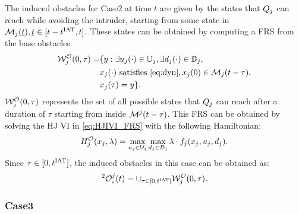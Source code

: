 The induced obstacles for Case2 at time $t$ are given by the states that $Q_j$ can reach while avoiding the intruder, starting from some state in $\mathcal{M}_j(\underline{t}), \underline{t} \in [t-t^\text{IAT}, t]$. These states can be obtained by computing a FRS from the base obstacles.
\begin{equation} \label{eq:ObsFRS_case2}
\begin{aligned}
\frs_{j}^{\mathcal{O}}(0, \tau) = & \{y: \exists \ctrl_j(\cdot) \in \cfset_j, \exists \dstb_j(\cdot) \in \dfset_j, \\
& \state_j(\cdot) \text{ satisfies \eqref{eq:dyn}}, \state_j(0) \in \boset_j(t-\tau), \\
& \state_j(\tau) = y\}.
\end{aligned}
\end{equation}
$\mathcal{W}_{j}^{\mathcal{O}}(0, \tau)$ represents the set of all possible states that $Q_j$ can reach after a duration of $\tau$ starting from inside $\mathcal{M}^j(t-\tau)$. This FRS can be obtained by solving the HJ VI in \eqref{eq:HJIVI_FRS} with the following Hamiltonian:
\begin{equation}
H_{j}^{\mathcal{O}}(x_j, \lambda) = \max_{u_j \in \mathcal{U}_j} \max_{d_j \in \mathcal{D}_j} \lambda \cdot f_j (x_j, u_j, d_j).
\end{equation} 
Since $\tau \in [0, t^\text{IAT}]$, the induced obstacles in this case can be obtained as:
\begin{equation} \label{eq:intruderObs_case2}
^2\ioset_i^j(t) = \cup_{\tau \in [0, \iat]} \frs_{j}^{\mathcal{O}}(0, \tau).
\end{equation}

\subsubsection{Case3} \label{sec:intruderObs_case3}


